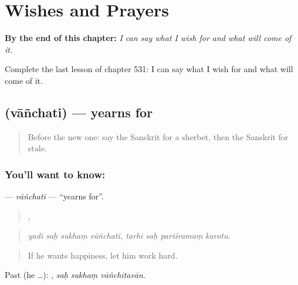 
\chapter{Wishes and Prayers}
\label{ch:sa-wishes-and-prayers}

\begin{chapteropening}
\textbf{By the end of this chapter:} \emph{I can say what I wish for and what will come of it.}

Complete the last lesson of chapter 531: I can say what I wish for and what will come of it.
\end{chapteropening}

\section[\texorpdfstring{\sk{वाञ्छति} (vāñchati)}{वाञ्छति (vāñchati)}]{ (vāñchati) — yearns for}

\label{lesson:SA-C531-vanchati}



\begin{quote}
Before the new one: say the Sanskrit for a sherbet, then the Sanskrit for stale.
\end{quote}

\subsection*{You'll want to know: }
\textbf{} — \emph{vāñchati} — \textquotedblleft{}yearns for\textquotedblright{}.

\begin{quote}
   ,    
\end{quote}

\begin{quote}
\emph{yadi saḥ sukhaṃ vāñchati, tarhi saḥ pariśramaṃ karotu.}
\end{quote}

\begin{quote}
If he wants happiness, let him work hard.
\end{quote}

Past (he …):   , \emph{saḥ sukhaṃ vāñchitavān}.

